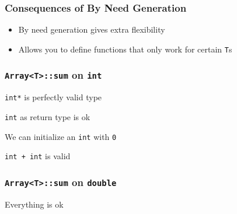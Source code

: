 \begin{frame}
  \frametitle{Consequences of By Need Generation}
  \begin{itemize}
    \item By need generation gives extra flexibility
    \item Allows you to define functions that only work for certain \texttt{T}s
  \end{itemize}
\end{frame}

\begin{frame}
  \frametitle{\texttt{Array<T>::sum} on \texttt{int}}
  \vskip-8mm
  \begin{overprint}
    \begin{center}
      \texttt{int*} is perfectly valid type
    \end{center}

    \begin{center}
      \texttt{int} as return type is ok
    \end{center}

    \begin{center}
      We can initialize an \texttt{int} with \texttt{0}
    \end{center}

    \begin{center}
      \texttt{int + int} is valid
    \end{center}
  \end{overprint}
\end{frame}

\begin{frame}
  \frametitle{\texttt{Array<T>::sum} on \texttt{double}}
  \vskip-8mm
  \begin{overprint}
    \begin{center}
      Everything is ok
    \end{center}
  \end{overprint}
\end{frame}

